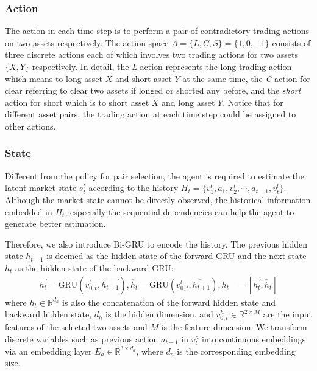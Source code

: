 \documentclass[sigconf]{acmart}
\begin{document}
\subsubsection{Action}
The action in each time step is to perform a pair of contradictory trading actions on two assets respectively.
The action space $A = \{L, C, S\} = \{1, 0, -1\}$ consists of three discrete actions each of which involves two trading actions for two assets $\{X, Y\}$ respectively.
In detail, the \textit{L} action represents the long trading action which means to long asset $X$ and short asset $Y$ at the same time, the \textit{C} action for clear referring to clear two assets if longed or shorted any before, and the \textit{short} action for short which is to short asset $X$ and long asset $Y$.
Notice that for different asset pairs, the trading action at each time step could be assigned to other actions.
	
\subsubsection{State}
Different from the policy for pair selection,
the agent is required to estimate the latent market state $s^l_t$ according to the history $H_t = \{v^l_1, a_1, v^l_2, \cdots, a_{t-1}, v^l_t\}$.
Although the market state cannot be directly observed, the historical information embedded in $H_t$, especially the sequential dependencies can help the agent to generate better estimation.

Therefore, we also introduce Bi-GRU to encode the history.
The previous hidden state $h_{t-1}$ is deemed as the hidden state of the forward GRU and the next state $h_{t}$ as the hidden state of the backward GRU:
\begin{equation}
 \begin{split}
 \overrightarrow{h_t} = \text{GRU}(v^l_{0, t}, \overrightarrow{h_{t-1}}),\overleftarrow{h_t} = \text{GRU}(v^l_{0, t}, \overleftarrow{h_{t+1}}), h_t &= [\overrightarrow{h_t},\overleftarrow{h_t}]
 \end{split}
\end{equation}
where $h_t \in \mathbb{R}^{d_h}$ is also the concatenation of the forward hidden state and backward hidden state, ${d_h}$ is the hidden dimension, and $v^h_{0, t} \in \mathbb{R}^{2 \times M}$ are the input features of the selected two assets and $M$ is the feature dimension.
We transform discrete variables such as previous action $a_{t-1}$ in $v^a_t$ into continuous embeddings via an embedding layer $E_a \in \mathbb{R}^{3 \times d_a}$, where $d_a$ is the corresponding embedding size.
\end{document}

